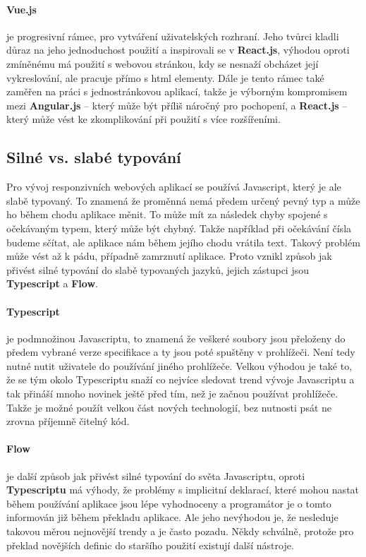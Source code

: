 \paragraph{Vue.js} je progresivní rámec, pro vytváření uživatelských rozhraní. Jeho tvůrci kladli důraz na jeho jednoduchost použití a inspirovali se v \textbf{React.js}, výhodou oproti zmíněnému má použití s webovou stránkou, kdy se nesnaží obcházet její vykreslování, ale pracuje přímo s html elementy. Dále je tento rámec také zaměřen na práci s jednostránkovou aplikací, takže je výborným kompromisem mezi \textbf{Angular.js} -- který může být příliš náročný pro pochopení, a \textbf{React.js} -- který může vést ke zkomplikování při použití s více rozšířeními. \cite{vue-js}

\subsection{Silné vs. slabé typování}
\par Pro vývoj responzivních webových aplikací se používá Javascript, který je ale slabě typovaný. To znamená že proměnná nemá předem určený pevný typ a může ho během chodu aplikace měnit. To může mít za následek chyby spojené s očekávaným typem, který může být chybný. Takže například při očekávání čísla budeme sčítat, ale aplikace nám během jejího chodu vrátila text. Takový problém může vést až k pádu, případně zamrznutí aplikace. Proto vznikl způsob jak přivést silné typování do slabě typovaných jazyků, jejich zástupci jsou \textbf{Typescript} a \textbf{Flow}.

\paragraph{Typescript} je podmnožinou Javascriptu, to znamená že veškeré soubory jsou přeloženy do předem vybrané verze specifikace a ty jsou poté spuštěny v prohlížeči. Není tedy nutné nutit uživatele do používání jiného prohlížeče. Velkou výhodou je také to, že se tým okolo Typescriptu snaží co nejvíce sledovat trend vývoje Javascriptu a tak přináší mnoho novinek ještě před tím, než je začnou používat prohlížeče. Takže je možné použít velkou část nových technologií, bez nutnosti psát ne zrovna příjemně čitelný kód. \cite{typescript}

\paragraph{Flow} je další způsob jak přivést silné typování do světa Javascriptu, oproti \textbf{Typescriptu} má výhody, že problémy s implicitní deklarací, které mohou nastat během používání aplikace jsou lépe vyhodnoceny a programátor je o tomto informován již během překladu aplikace. Ale jeho nevýhodou je, že nesleduje takovou měrou nejnovější trendy a je často pozadu. Někdy schválně, protože pro překlad novějších definic do staršího použití existují další nástroje. \cite{flow}

